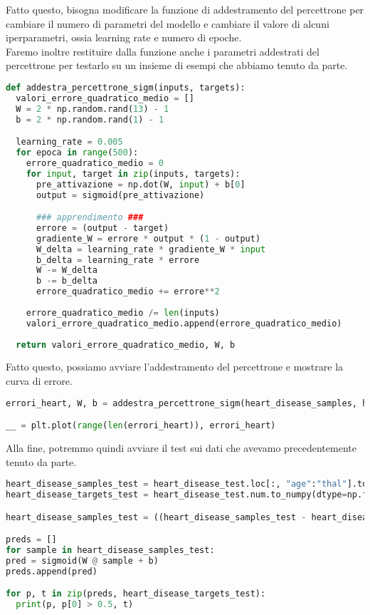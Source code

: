 \documentclass[12pt, a4paper]{article}
\begin{document}
Fatto questo, bisogna modificare la funzione di addestramento del percettrone per cambiare il numero di parametri del modello e cambiare il valore di alcuni iperparametri, ossia learning rate e numero di epoche.\\
Faremo inoltre restituire dalla funzione anche i parametri addestrati del percettrone per testarlo su un insieme di esempi che abbiamo tenuto da parte.

\begin{lstlisting}[language=Python, caption=Funzione di Addestramento]
def addestra_percettrone_sigm(inputs, targets):
  valori_errore_quadratico_medio = [] 
  W = 2 * np.random.rand(13) - 1
  b = 2 * np.random.rand(1) - 1

  learning_rate = 0.005
  for epoca in range(500):
    errore_quadratico_medio = 0
    for input, target in zip(inputs, targets): 
      pre_attivazione = np.dot(W, input) + b[0]
      output = sigmoid(pre_attivazione) 

      ### apprendimento ###
      errore = (output - target)
      gradiente_W = errore * output * (1 - output)
      W_delta = learning_rate * gradiente_W * input
      b_delta = learning_rate * errore
      W -= W_delta
      b -= b_delta
      errore_quadratico_medio += errore**2
      
    errore_quadratico_medio /= len(inputs)
    valori_errore_quadratico_medio.append(errore_quadratico_medio)
  
  return valori_errore_quadratico_medio, W, b   
\end{lstlisting}

Fatto questo, possiamo avviare l'addestramento del percettrone e mostrare la curva di errore.

\begin{lstlisting}[language=Python, caption=Addestramento del Percettrone]
errori_heart, W, b = addestra_percettrone_sigm(heart_disease_samples, heart_disease_targets)

__ = plt.plot(range(len(errori_heart)), errori_heart)
\end{lstlisting}

Alla fine, potremmo quindi avviare il test sui dati che avevamo precedentemente tenuto da parte.

\begin{lstlisting}[language=Python, caption=Labelling dei Dati e Predizione]
heart_disease_samples_test = heart_disease_test.loc[:, "age":"thal"].to_numpy()
heart_disease_targets_test = heart_disease_test.num.to_numpy(dtype=np.float64)

heart_disease_samples_test = ((heart_disease_samples_test - heart_disease_samples_test.mean(axis=0)) / heart_disease_samples_test.std(axis=0))

preds = []
for sample in heart_disease_samples_test:
pred = sigmoid(W @ sample + b)
preds.append(pred)

for p, t in zip(preds, heart_disease_targets_test):
  print(p, p[0] > 0.5, t)
\end{lstlisting}
\end{document}
